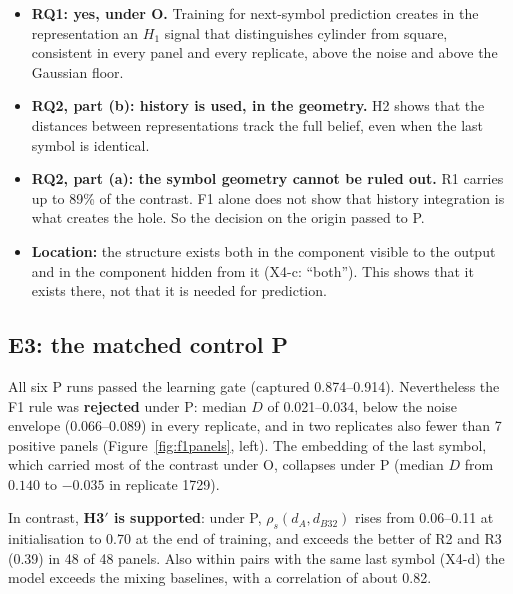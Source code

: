 \documentclass[12pt,a4paper]{article}
\newcommand{\en}[1]{\foreignlanguage{english}{#1}}   %
\begin{document}
\begin{meaningbox}
\begin{itemize}[leftmargin=*]
\item \textbf{RQ1: yes, under O.} Training for next-symbol prediction creates in the representation an $H_1$ signal that distinguishes cylinder from square, consistent in every panel and every replicate, above the noise and above the Gaussian floor.
\item \textbf{RQ2, part (b): history is used, in the geometry.} H2 shows that the distances between representations track the full belief, even when the last symbol is identical.
\item \textbf{RQ2, part (a): the symbol geometry cannot be ruled out.} R1 carries up to 89\% of the contrast. F1 alone does not show that history integration is what creates the hole. So the decision on the origin passed to P.
\item \textbf{Location:} the structure exists both in the component visible to the output and in the component hidden from it (\en{X4-c}: ``\en{both}''). This shows that it exists there, not that it is needed for prediction.
\end{itemize}
\end{meaningbox}

\subsection{\en{E3}: the matched control P}\label{sec:e3p}
All six P runs passed the learning gate ($\mathrm{captured}$ 0.874–0.914). Nevertheless the F1 rule was \textbf{rejected} under P: median $D$ of 0.021–0.034, below the noise envelope (0.066–0.089) in every replicate, and in two replicates also fewer than 7 positive panels (Figure~\ref{fig:f1panels}, left). The \en{embedding} of the last symbol, which carried most of the contrast under O, collapses under P (median $D$ from $0.140$ to $-0.035$ in replicate 1729).

In contrast, \textbf{H3$'$ is supported}: under P, $\rho_s(d_A,d_{B32})$ rises from 0.06–0.11 at initialisation to 0.70 at the end of training, and exceeds the better of R2 and R3 (0.39) in 48 of 48 panels. Also within pairs with the same last symbol (\en{X4-d}) the model exceeds the mixing baselines, with a correlation of about 0.82.
\end{document}
